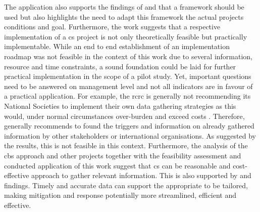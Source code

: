 The application also supports the findings of \autocite{garciaFindingWhatYou2021} and \autocite{conradCommunityBasedMonitoringFrameworks2008} that a framework should be used but also highlights the need to adapt this framework the actual projects conditions and goal. Furthermore, the work suggests that a respective implementation of a \acrlong{cs} project is not only theoretically feasible but practically implementable. While an end to end establishment of an implementation roadmap was not feasible in the context of this work due to several information, resource and time constraints, a sound foundation could be laid for further practical implementation in the scope of a pilot study. Yet, important questions need to be answered on management level and not all indicators are in favour of a practical application. For example, the \acrshort{rcrc} is generally not recommending its National Societies to implement their own data gathering strategies as this would, under normal circumstances over-burden and exceed costs \autocite{rcrcFORECASTBASEDFINANCINGEARLY2020}. Therefore, \autocite{rcrcFORECASTBASEDFINANCINGEARLY2020} generally recommends to found the triggers and information on already gathered information by other stakeholders or international organisations. As suggested by the results, this is not feasible in this context. Furthermore, the analysis of the \acrshort{cbs} approach and other projects together with the feasibility assessment and conducted application of this work suggest that \acrshort{cs} can be reasonable and cost-effective approach to gather relevant information. This is also supported by \autocite{aceves-buenoCitizenScienceApproach2015} and \autocite{minkmanCitizenScienceWater2015} findings. Timely and accurate data can support the appropriate  to be tailored, making mitigation and response potentially more streamlined, efficient and effective.\newline


